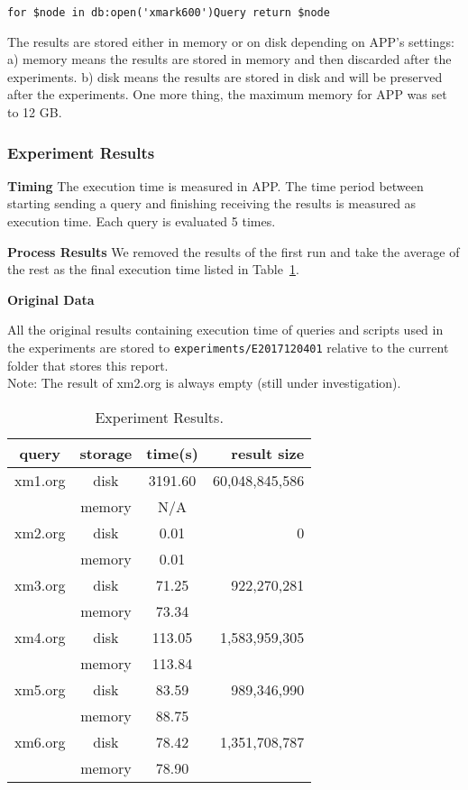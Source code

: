 \verb|for $node in db:open('xmark600')Query return $node|

The results are stored either in memory or on disk depending on APP's settings:
a) memory means the results are stored in memory and then discarded after the
experiments. b) disk means the results are stored in disk and will be preserved
after the experiments. One more thing, the maximum memory for APP was set to 12 GB.


\subsubsection{Experiment Results}

\textbf{Timing} The execution time is measured in APP. The time period between
starting sending a query and finishing receiving the results is measured as
execution time. Each query is evaluated 5 times. 

\textbf{Process Results}
We removed the results of the  first run and take the average of the rest as
the final execution time listed in Table~\ref{table:E2017120401_1}.


\textbf{Original Data}

All the original results containing execution time of queries and scripts used 
in the experiments  are stored to \texttt{experiments/E2017120401} relative to
the current folder that stores this report.\\

Note: The result of xm2.org is always empty (still under investigation).


\begin{table}[t]
	\caption{Experiment Results.}
	\label{table:E2017120401_1}
	\centering
	\begin{tabular}{c|c|c|r}
 		\hline \hline
 query  & storage & time(s)  &   result size  \\
 \hline \hline
 xm1.org &  disk   & 3191.60  & 60,048,845,586 \\
         & memory  &    N/A   &  \\
 \hline
 xm2.org &  disk   &    0.01  &              0 \\
         & memory  &    0.01  &  \\
  \hline
 xm3.org &  disk   &  71.25  &    922,270,281 \\
         & memory  &  73.34  &  \\
  \hline
 xm4.org &  disk   &  113.05  &  1,583,959,305 \\
         & memory  &  113.84  &  \\
  \hline
 xm5.org &  disk   &  83.59  &    989,346,990 \\
         & memory  &  88.75   &   \\
  \hline
 xm6.org &  disk   &  78.42   &  1,351,708,787 \\
         & memory  &  78.90   &   \\
 \hline \hline
	\end{tabular}
\end{table}





